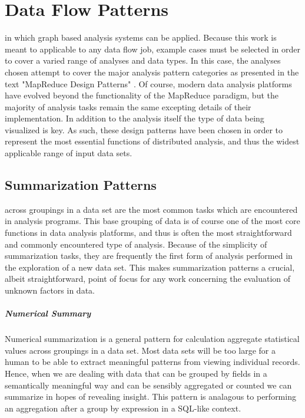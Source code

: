 \chapter{Data Flow Patterns}
\label{sec:dataflowpatterns}
 in which graph based analysis systems can be applied. Because this work is meant to applicable to any data flow job, example cases must be selected in order to cover a varied range of analyses and data types. In this case, the analyses chosen attempt to cover the major analysis pattern categories as presented in the text "MapReduce Design Patterns" \cite{Miner2012}. Of course, modern data analysis platforms have evolved beyond the functionality of the MapReduce paradigm, but the majority of analysis tasks remain the same excepting details of their implementation. In addition to the analysis itself the type of data being visualized is key. As such, these design patterns have been chosen in order to represent the most essential functions of distributed analysis, and thus the widest applicable range of input data sets.

\section{Summarization Patterns}
\label{sec:summarization}
 across groupings in a data set are the most common tasks which are encountered in analysis programs. This base grouping of data is of course one of the most core functions in data analysis platforms, and thus is often the most straightforward and commonly encountered type of analysis. Because of the simplicity of summarization tasks, they are frequently the first form of analysis performed in the exploration of a new data set. This makes summarization patterns a crucial, albeit straightforward, point of focus for any work concerning the evaluation of unknown factors in data.

\paragraph{Numerical Summary}
Numerical summarization is a general pattern for calculation aggregate statistical values across groupings in a data set. Most data sets will be too large for a human to be able to extract meaningful patterns from viewing individual records. Hence, when we are dealing with data that can be grouped by fields in a semantically meaningful way and can be sensibly aggregated or counted we can summarize in hopes of revealing insight. This pattern is analagous to performing an aggregation after a group by expression in a SQL-like context.

